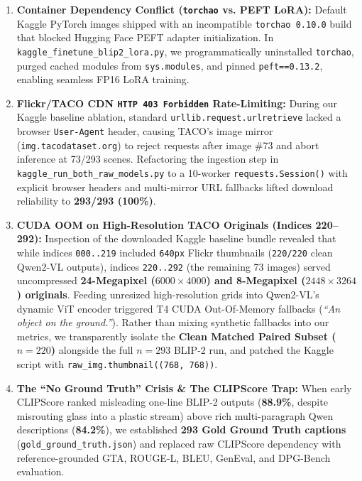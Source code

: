 \documentclass[11pt,a4paper]{article}
\begin{document}
\begin{enumerate}[leftmargin=1.5em]
    \item \textbf{Container Dependency Conflict (\texttt{torchao} vs. PEFT LoRA):} Default Kaggle PyTorch images shipped with an incompatible \texttt{torchao 0.10.0} build that blocked Hugging Face PEFT adapter initialization. In \texttt{kaggle\_finetune\_blip2\_lora.py}, we programmatically uninstalled \texttt{torchao}, purged cached modules from \texttt{sys.modules}, and pinned \texttt{peft==0.13.2}, enabling seamless FP16 LoRA training.
    \item \textbf{Flickr/TACO CDN \texttt{HTTP 403 Forbidden} Rate-Limiting:} During our Kaggle baseline ablation, standard \texttt{urllib.request.urlretrieve} lacked a browser \texttt{User-Agent} header, causing TACO's image mirror (\texttt{img.tacodataset.org}) to reject requests after image \#73 and abort inference at 73/293 scenes. Refactoring the ingestion step in \texttt{kaggle\_run\_both\_raw\_models.py} to a 10-worker \texttt{requests.Session()} with explicit browser headers and multi-mirror URL fallbacks lifted download reliability to \textbf{293/293 (100\%)}.
    \item \textbf{CUDA OOM on High-Resolution TACO Originals (Indices 220--292):} Inspection of the downloaded Kaggle baseline bundle revealed that while indices \texttt{000..219} included \texttt{640px} Flickr thumbnails (\texttt{220/220} clean Qwen2-VL outputs), indices \texttt{220..292} (the remaining 73 images) served uncompressed \textbf{24-Megapixel ($6000 \times 4000$) and 8-Megapixel ($2448 \times 3264$) originals}. Feeding unresized high-resolution grids into Qwen2-VL's dynamic ViT encoder triggered T4 CUDA Out-Of-Memory fallbacks (\textit{``An object on the ground.''}). Rather than mixing synthetic fallbacks into our metrics, we transparently isolate the \textbf{Clean Matched Paired Subset ($n=220$)} alongside the full $n=293$ BLIP-2 run, and patched the Kaggle script with \texttt{raw\_img.thumbnail((768, 768))}.
    \item \textbf{The ``No Ground Truth'' Crisis \& The CLIPScore Trap:} When early CLIPScore ranked misleading one-line BLIP-2 outputs (\textbf{88.9\%}, despite misrouting glass into a plastic stream) above rich multi-paragraph Qwen descriptions (\textbf{84.2\%}), we established \textbf{293 Gold Ground Truth captions} (\texttt{gold\_ground\_truth.json}) and replaced raw CLIPScore dependency with reference-grounded GTA, ROUGE-L, BLEU, GenEval, and DPG-Bench evaluation.
\end{enumerate}
\end{document}
